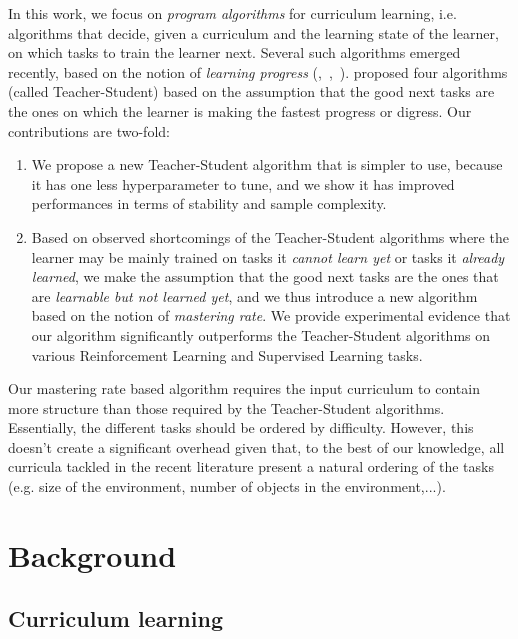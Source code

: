 \documentclass{article}
\begin{document}
In this work, we focus on \textit{program algorithms} for curriculum learning, i.e. algorithms that decide, given a curriculum and the learning state of the learner, on which tasks to train the learner next.  Several such algorithms emerged recently, based on the notion of \textit{learning progress} (\citep{matiisen2017teacher},~\citep{graves2017automated},~\citep{fournier2018}). \citep{matiisen2017teacher} proposed four algorithms (called Teacher-Student) based on the assumption that the good next tasks are the ones on which the learner is making the fastest progress or digress. Our contributions are two-fold:
\begin{enumerate}
    \item We propose a new Teacher-Student algorithm that is simpler to use, because it has one less hyperparameter to tune, and we show it has improved performances in terms of stability and sample complexity. 
    \item Based on observed shortcomings of the Teacher-Student algorithms where the learner may be mainly trained on tasks it \textit{cannot learn yet} or tasks it \textit{already learned}, we make the assumption that the good next tasks are the ones that are \textit{learnable but not learned yet}, and we thus introduce a new algorithm based on the notion of \textit{mastering rate}. We provide experimental evidence that our algorithm significantly outperforms the Teacher-Student algorithms on various Reinforcement Learning and Supervised Learning tasks.
\end{enumerate}

Our mastering rate based algorithm requires the input curriculum to contain more structure than those required by the Teacher-Student algorithms. Essentially, the different tasks should be ordered by difficulty. However, this doesn't create a significant overhead given that, to the best of our knowledge, all curricula tackled in the recent literature present a natural ordering of the tasks (e.g. size of the environment, number of objects in the environment,...).


\section{Background}
\label{section2}

\subsection{Curriculum learning}
\end{document}
